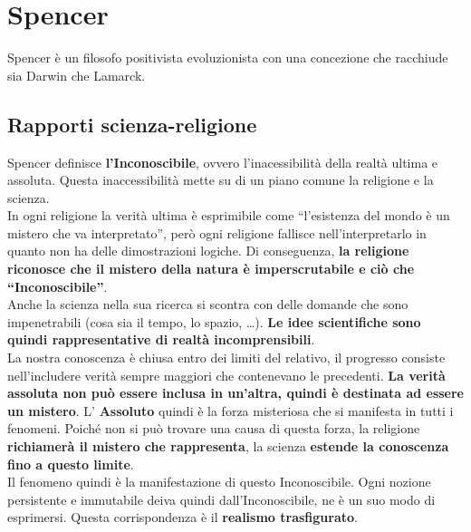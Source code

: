 
\section{Spencer}
Spencer è un filosofo positivista evoluzionista con una concezione che racchiude sia Darwin che 
Lamarck.

\subsection{Rapporti scienza-religione}
Spencer definisce \textbf{l'Inconoscibile}, ovvero l'inacessibilità della realtà ultima e assoluta.
Questa inaccessibilità mette su di un piano comune la religione e la scienza.\\
In ogni religione la verità ultima è esprimibile come ``l'esistenza del mondo è un mistero che va
interpretato'', però ogni religione fallisce nell'interpretarlo in quanto non ha delle dimostrazioni
logiche. Di conseguenza, \textbf{la religione riconosce che il mistero della natura è imperscrutabile
e ciò che ``Inconoscibile''}.\\
Anche la scienza nella sua ricerca si scontra con delle domande che sono impenetrabili (cosa sia il
tempo, lo spazio, \ldots). \textbf{Le idee scientifiche sono quindi rappresentative di realtà
incomprensibili}.\\
La nostra conoscenza è chiusa entro dei limiti del relativo, il progresso consiste nell'includere
verità sempre maggiori che contenevano le precedenti. \textbf{La verità assoluta non può essere
inclusa in un'altra, quindi è destinata ad essere un mistero}. L' \textbf{Assoluto} quindi è la
forza misteriosa che si manifesta in tutti i fenomeni. Poiché non si può trovare una causa di questa
forza, la religione \textbf{richiamerà il mistero che rappresenta}, la scienza \textbf{estende la
conoscenza fino a questo limite}.\\
Il fenomeno quindi è la manifestazione di questo Inconoscibile. Ogni nozione persistente e immutabile
deiva quindi dall'Inconoscibile, ne è un suo modo di esprimersi. Questa corrispondenza è il
\textbf{realismo trasfigurato}. 

